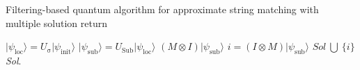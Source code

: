 \begin{algorithm}[ht]
	\caption{Filtering-based quantum algorithm for approximate string matching with multiple solution return}
	\label{alg:quantum-filtering-many-solutions}
	\begin{algorithmic}[1]
			\STATE $\vert \psi_{\mathrm{loc}} \rangle = U_{\mathrm{\sigma}} \vert \psi_{\mathrm{init}} \rangle$
			\STATE $\vert \psi_{\mathrm{sub}} \rangle = U_{\mathrm{Sub}} \vert \psi_{\mathrm{loc}} \rangle$
			\STATE $\left(M \otimes I\right) \vert \psi_{\mathrm{sub}} \rangle$
			\STATE $i = \left(I \otimes M\right) \vert \psi_{\mathrm{sub}} \rangle$
			\STATE $Sol\ \bigcup\ \{i\}$
		\ENDFOR
		\RETURN \textit{Sol}.
	\end{algorithmic}
\end{algorithm}

